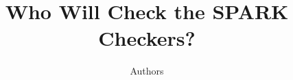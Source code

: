 \documentclass{llncs}
\begin{document}
\title{Who Will Check the SPARK Checkers?}


\author{Authors}


\maketitle













% 
% 

\end{document}
